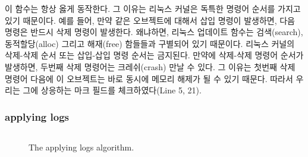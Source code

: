 이 함수는 항상 옳게 동작한다. 그 이유는 리눅스 커널은 독특한 명령어 순서를 가지고 있기 
때문이다.
예를 들어, 만약 같은 오브젝트에 대해서 삽입 명령이 발생하면, 다음 명령은 반드시 삭제 명령이 발생한다.
왜냐하면, 리눅스 업데이트 함수는 검색(search), 동적할당(alloc) 그리고 해재(free) 함들들과 
구별되어 있기 때문이다.
리눅스 커널의 삭제-삭제 순서 또는 삽입-삽입 명령 순서는 금지된다. 
만약에 삭제-삭제 명령어 순서가 발생하면, 두번째 삭제 명령어는 크레쉬(crash) 만날 수 있다.
그 이유는 첫번째 삭제 명령어 다음에 이 오브젝트는 바로 동시에 메모리 해제가 될 수 있기 때문다.
따라서 우리는 그에 상응하는 마크 필드를 체크하였다(Line 5, 21).


\subsubsection{applying logs}

\begin{figure}[h]
\begin{center}
\inputminted[linenos,fontsize=\footnotesize, tabsize=2]{c}{src/ldu_physical.c}
\end{center}
\caption{The \LDU applying logs algorithm.}
\label{fig:glduphysicalupdate}
\end{figure}



